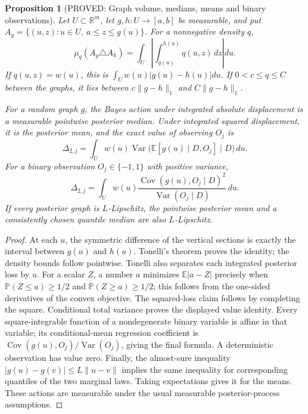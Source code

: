 \documentclass[11pt]{article}
\newcommand{\E}{\mathbb E}
\newtheorem{proposition}[theorem]{Proposition}
\theoremstyle{definition}
\theoremstyle{remark}
\begin{document}
\begin{proposition}[PROVED: Graph volume, medians, means and binary observations]
\label{rthreegeo:graphloss}
Let $U\subset\mathbb R^m$, let $g,h:U\to[a,b]$ be measurable, and put
$A_g=\{(u,z):u\in U,\ a\le z\le g(u)\}$.
For a nonnegative density $q$,
\[
 \mu_q(A_g\triangle A_h)
 =\int_U\left|\int_{g(u)}^{h(u)}q(u,z)\,dz\right|du.
\]
If $q(u,z)=w(u)$, this is $\int_Uw(u)|g(u)-h(u)|du$.
If $0<c\le q\le C$ between the graphs, it lies between
$c\|g-h\|_1$ and $C\|g-h\|_1$.

For a random graph $g$, the Bayes action under integrated absolute
displacement is a measurable pointwise posterior median. Under
integrated squared displacement, it is the posterior mean, and the
exact value of observing $O_j$ is
\[
 \Delta_{2,j}
 =\int_Uw(u)\operatorname{Var}\bigl(\E[g(u)\mid D,O_j]\mid D\bigr)\,du.
\]
For a binary observation $O_j\in\{-1,1\}$ with positive variance,
\[
 \Delta_{2,j}
 =\int_Uw(u)
 \frac{\operatorname{Cov}(g(u),O_j\mid D)^2}
      {\operatorname{Var}(O_j\mid D)}\,du.
\]
If every posterior graph is $L$-Lipschitz, the pointwise posterior mean
and a consistently chosen quantile median are also $L$-Lipschitz.
\end{proposition}
\begin{proof}
At each $u$, the symmetric difference of the vertical sections is exactly
the interval between $g(u)$ and $h(u)$. Tonelli's theorem proves the
identity; the density bounds follow pointwise.
Tonelli also separates each integrated posterior loss by $u$.
For a scalar $Z$, a number $a$ minimizes $\E|a-Z|$ precisely when
$\mathbb P(Z\le a)\ge1/2$ and $\mathbb P(Z\ge a)\ge1/2$; this follows
from the one-sided derivatives of the convex objective. The squared-loss
claim follows by completing the square.
Conditional total variance proves the displayed value identity.
Every square-integrable function of a nondegenerate binary variable is
affine in that variable; its conditional-mean regression coefficient is
$\operatorname{Cov}(g(u),O_j)/\operatorname{Var}(O_j)$, giving the final
formula. A deterministic observation has value zero.
Finally, the almost-sure inequality
$|g(u)-g(v)|\le L\|u-v\|$ implies the same inequality for corresponding
quantiles of the two marginal laws. Taking expectations gives it for
the means. These actions are measurable under the usual measurable
posterior-process assumptions.
\end{proof}
\end{document}
